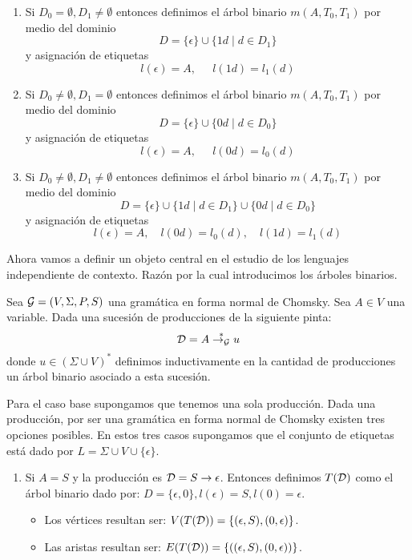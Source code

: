 \documentclass[tesis.tex]{subfiles}
\begin{document}
\begin{leoenv}
\begin{deff}
\begin{enumerate}
		\item Si $D_{0} = \emptyset, D_{1} \neq \emptyset$ entonces definimos el árbol binario $m(A,T_{0},T_{1})$ por medio del dominio  
		\[
			D = \{ \epsilon \} \cup \{ 1d \mid d \in D_{1} \}
		\]
		y asignación de etiquetas
		\[
			l(\epsilon) = A, \ \ \quad l(1d) = l_{1}(d)
		\]

		\item Si $D_{0} \neq \emptyset, D_{1} = \emptyset$ entonces definimos el árbol binario $m(A,T_{0},T_{1})$ por medio del dominio  
		\[
			D = \{ \epsilon \} \cup \{ 0d \mid d \in D_{0} \}
		\]
		y asignación de etiquetas
		\[
			l(\epsilon) = A, \ \ \quad l(0d) = l_{0}(d)
		\]

		\item Si $D_{0} \neq \emptyset, D_{1} \neq \emptyset$ entonces definimos el árbol binario $m(A,T_{0},T_{1})$ por medio del dominio
		\[
			D = \{ \epsilon \} \cup \{ 1d \mid d \in D_{1} \} \cup \{ 0d \mid d \in D_{0} \}
		\]
		y asignación de etiquetas
		\[
			l(\epsilon) = A, \quad l(0d) = l_{0}(d), \quad  l(1d) = l_{1}(d)
		\]
	\end{enumerate}
\end{deff}

Ahora vamos a definir un objeto central en el estudio de los lenguajes independiente de contexto.
Razón por la cual introducimos los árboles binarios.

Sea ${\cal G} = (V, \Sigma, P, S)$ una gramática \ic{} en forma normal de Chomsky.
Sea $A \in V$ una variable.
Dada una sucesión de producciones de la siguiente pinta:
\[
	{\cal D} =  A \overset{*}{\to_{\cal G}} u
\]
donde $u \in (\Sigma \cup V)^{*}$ definimos inductivamente en la cantidad de producciones un árbol binario asociado a esta sucesión.

Para el caso base supongamos que tenemos una sola producción.
Dada una producción, por ser una gramática \ic en forma normal de Chomsky existen tres opciones posibles.
En estos tres casos supongamos que el conjunto de etiquetas está dado por $L = \Sigma \cup V \cup \{ \epsilon \}$. 
\begin{enumerate}
	\item Si $A=S$ y la producción es ${\cal D} = S \to \epsilon$.
		Entonces definimos $T({\cal D})$ como el árbol binario dado por:
		$D = \{ \epsilon, 0 \}, l(\epsilon) = S, 
		l(0) = \epsilon$.
		\begin{itemize}
			\item Los vértices resultan ser: $V(T({\cal D})) = \{ (\epsilon,S), (0, \epsilon) \}$.
			\item Las aristas resultan ser:
			$E(T({\cal D})) =\{ ((\epsilon,S), (0, \epsilon))\}$. 
		\end{itemize}
		

\end{enumerate}
\end{leoenv}
\end{document}
